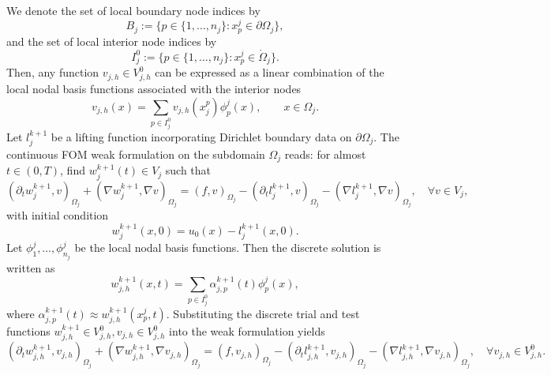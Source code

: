 \documentclass[a4paper, 11pt]{article}
\theoremstyle{remark}
\begin{document}
We denote the set of local boundary node indices by
\begin{equation*}
    B_{j} := \{p\in \{1, \ldots, n_{j}\} : x_{p}^{j}\in\partial\Omega_j\},
\end{equation*}
and the set of local interior node indices by
\begin{equation*}
    I^{0}_{j} := \{p\in \{1, \ldots, n_{j}\} : x_{p}^{j}\in\mathring{\Omega}_{j}\}.
\end{equation*}
Then, any function $v_{j, h}\in V^{0}_{j, h}$ can be expressed as a linear combination of the local nodal basis functions associated with the interior nodes
\begin{equation*}
    v_{j, h}(x) = \sum_{p\in I^{0}_{j}}v_{j, h}(x_{j}^{p})\phi_{p}^{j}(x), \qquad x\in \Omega_{j}.
\end{equation*}
Let $l_{j}^{k+1}$ be a lifting function incorporating Dirichlet boundary data on $\partial\Omega_{j}$. The continuous FOM weak formulation on the subdomain $\Omega_{j}$ reads: for almost $t\in (0, T)$, find $w_{j}^{k+1}(t)\in V_{j}$ such that
\begin{equation*}
    \left(\partial_{t} w_{j}^{k+1}, v\right)_{\Omega_{j}} + \left(\nabla w_{j}^{k+1}, \nabla v\right)_{\Omega_{j}} = \left(f, v\right)_{\Omega_{j}} - \left(\partial_{t} l_{j}^{k+1}, v\right)_{\Omega_{j}} - \left(\nabla l_{j}^{k+1}, \nabla v\right)_{\Omega_{j}}, \quad\forall v\in V_{j},
\end{equation*}
with initial condition
\begin{equation*}
    w^{k+1}_{j}(x, 0) = u_{0}(x) - l_{j}^{k+1}(x, 0).
\end{equation*}
Let $\phi^{j}_{1}, \ldots, \phi^{j}_{n_{j}}$ be the local nodal basis functions. Then the discrete solution is written as
\begin{equation*}
    w^{k+1}_{j, h}(x, t) = \sum_{p\in I^{0}_{j}}\alpha_{j, p}^{k+1}(t)\phi_{p}^{j}(x),
\end{equation*}
where $\alpha_{j, p}^{k+1}(t)\approx w^{k+1}_{j, h}(x_{p}^{j}, t)$. Substituting the discrete trial and test functions $w^{k+1}_{j, h}\in V_{j, h}^{0}, v_{j, h}\in V_{j, h}^{0}$ into the weak formulation yields
\begin{equation*}
    \left(\partial_{t} w_{j, h}^{k+1}, v_{j, h}\right)_{\Omega_{j}} + \left(\nabla w_{j, h}^{k+1}, \nabla v_{j, h}\right)_{\Omega_{j}} = \left(f, v_{j, h}\right)_{\Omega_{j}} - \left(\partial_{t} l_{j, h}^{k+1}, v_{j, h}\right)_{\Omega_{j}} - \left(\nabla l_{j, h}^{k+1}, \nabla v_{j, h}\right)_{\Omega_{j}}, \quad\forall v_{j, h}\in V^{0}_{j, h}.
\end{equation*}
\end{document}
